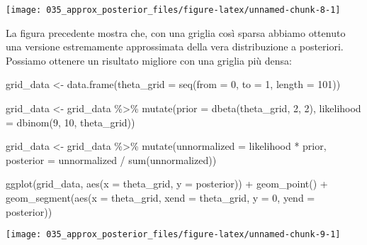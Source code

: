 \documentclass[
]{memoir}
\newenvironment{Shaded}{\begin{snugshade}}{\end{snugshade}}
\newcommand{\AttributeTok}[1]{\textcolor[rgb]{0.77,0.63,0.00}{#1}}
\newcommand{\DecValTok}[1]{\textcolor[rgb]{0.00,0.00,0.81}{#1}}
\newcommand{\FunctionTok}[1]{\textcolor[rgb]{0.00,0.00,0.00}{#1}}
\newcommand{\NormalTok}[1]{#1}
\newcommand{\OtherTok}[1]{\textcolor[rgb]{0.56,0.35,0.01}{#1}}
\newcommand{\SpecialCharTok}[1]{\textcolor[rgb]{0.00,0.00,0.00}{#1}}
\begin{document}
\begin{center}\texttt{[image: 035\_approx\_posterior\_files/figure-latex/unnamed-chunk-8-1]} \end{center}

\noindent
La figura precedente mostra che, con una griglia così sparsa abbiamo ottenuto una versione estremamente approssimata della vera distribuzione a posteriori. Possiamo ottenere un risultato migliore con una griglia più densa:

\begin{Shaded}
\begin{Highlighting}[]
\NormalTok{grid\_data  }\OtherTok{\textless{}{-}} \FunctionTok{data.frame}\NormalTok{(}\AttributeTok{theta\_grid =} \FunctionTok{seq}\NormalTok{(}\AttributeTok{from =} \DecValTok{0}\NormalTok{, }\AttributeTok{to =} \DecValTok{1}\NormalTok{, }\AttributeTok{length =} \DecValTok{101}\NormalTok{))}

\NormalTok{grid\_data }\OtherTok{\textless{}{-}}\NormalTok{ grid\_data }\SpecialCharTok{\%\textgreater{}\%}
  \FunctionTok{mutate}\NormalTok{(}\AttributeTok{prior =} \FunctionTok{dbeta}\NormalTok{(theta\_grid, }\DecValTok{2}\NormalTok{, }\DecValTok{2}\NormalTok{),}
         \AttributeTok{likelihood =} \FunctionTok{dbinom}\NormalTok{(}\DecValTok{9}\NormalTok{, }\DecValTok{10}\NormalTok{, theta\_grid))}

\NormalTok{grid\_data }\OtherTok{\textless{}{-}}\NormalTok{ grid\_data }\SpecialCharTok{\%\textgreater{}\%}
  \FunctionTok{mutate}\NormalTok{(}\AttributeTok{unnormalized =}\NormalTok{ likelihood }\SpecialCharTok{*}\NormalTok{ prior,}
         \AttributeTok{posterior =}\NormalTok{ unnormalized }\SpecialCharTok{/} \FunctionTok{sum}\NormalTok{(unnormalized))}

\FunctionTok{ggplot}\NormalTok{(grid\_data, }\FunctionTok{aes}\NormalTok{(}\AttributeTok{x =}\NormalTok{ theta\_grid, }\AttributeTok{y =}\NormalTok{ posterior)) }\SpecialCharTok{+}
  \FunctionTok{geom\_point}\NormalTok{() }\SpecialCharTok{+}
  \FunctionTok{geom\_segment}\NormalTok{(}\FunctionTok{aes}\NormalTok{(}\AttributeTok{x =}\NormalTok{ theta\_grid, }\AttributeTok{xend =}\NormalTok{ theta\_grid, }\AttributeTok{y =} \DecValTok{0}\NormalTok{, }\AttributeTok{yend =}\NormalTok{ posterior))}
\end{Highlighting}
\end{Shaded}

\begin{center}\texttt{[image: 035\_approx\_posterior\_files/figure-latex/unnamed-chunk-9-1]} \end{center}
\end{document}
